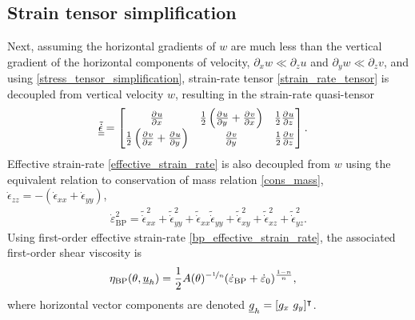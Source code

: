 \subsection{Strain tensor simplification} \label{ssn_strain_tensor_simplification}

Next, assuming the horizontal gradients of $w$ are much less than the vertical gradient of the horizontal components of velocity, \ie $\partial_x w \ll \partial_z u$ and $\partial_y w \ll \partial_z v$, and using \cref{stress_tensor_simplification}, strain-rate tensor \cref{strain_rate_tensor} is decoupled from vertical velocity $w$, resulting in the strain-rate quasi-tensor
\begin{align}
  \label{bp_strain_rate_tensor}
  \tilde{\underline{\underline{\dot{\epsilon}}}}
  &= \begin{bmatrix}
       \frac{\partial{^{}} u}{\partial x{^{}} } & \frac{1}{2}\left( \frac{\partial{^{}} u}{\partial y{^{}} } + \frac{\partial{^{}} v}{\partial x{^{}} } \right) & \frac{1}{2} \frac{\partial{^{}} u}{\partial z{^{}} } \\
       \frac{1}{2}\left( \frac{\partial{^{}} v}{\partial x{^{}} } + \frac{\partial{^{}} u}{\partial y{^{}} } \right) & \frac{\partial{^{}} v}{\partial y{^{}} } & \frac{1}{2} \frac{\partial{^{}} v}{\partial z{^{}} } \\
     \end{bmatrix}.
\end{align}
Effective strain-rate \cref{effective_strain_rate} is also decoupled from $w$ using the equivalent relation to conservation of mass relation \cref{cons_mass}, $\dot{\epsilon}_{zz} = -\left(\dot{\epsilon}_{xx} + \dot{\epsilon}_{yy} \right)$,
\begin{align}
  \label{bp_effective_strain_rate}
  \dot{\varepsilon}_{\text{BP}}^2 = \tilde{\dot{\epsilon}}_{xx}^2 + \tilde{\dot{\epsilon}}_{yy}^2 + \tilde{\dot{\epsilon}}_{xx} \tilde{\dot{\epsilon}}_{yy} + \tilde{\dot{\epsilon}}_{xy}^2 + \tilde{\dot{\epsilon}}_{xz}^2 + \tilde{\dot{\epsilon}}_{yz}^2.
\end{align}
Using first-order effective strain-rate \cref{bp_effective_strain_rate}, the associated first-order shear viscosity is
\begin{align}
  \label{bp_viscosity}
  \eta_{\text{BP}}(\theta, \underline{u}_h) &= \frac{1}{2}A(\theta)^{-\nicefrac{1}{n}} (\dot{\varepsilon}_{\text{BP}} + \dot{\varepsilon}_0)^{\frac{1-n}{n}},
\end{align} 
where horizontal vector components are denoted $\rankone{g}_h = [g_x\ g_y]^\intercal$.

